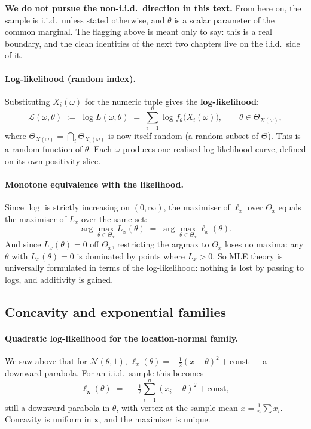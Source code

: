 \documentclass[a4paper,oneside,12pt]{extarticle}
\theoremstyle{plain}
\theoremstyle{definition}
\theoremstyle{remark}
\begin{document}
\textbf{We do not pursue the non-i.i.d.\ direction in this text.}
From here on, the sample is i.i.d.\ unless stated otherwise, and
$\theta$ is a scalar parameter of the common marginal.  The
flagging above is meant only to say: this is a real boundary, and
the clean identities of the next two chapters live on the
i.i.d.\ side of it.

\paragraph{Log-likelihood (random index).}
Substituting $X_i(\omega)$ for the numeric tuple gives the
\textbf{log-likelihood}:
\[
  \mathcal{L}(\omega,\theta)
  \;:=\; \log L(\omega,\theta)
  \;=\; \sum_{i=1}^n \log f_\theta\bigl(X_i(\omega)\bigr),
  \qquad
  \theta \in \Theta_{X(\omega)},
\]
where $\Theta_{X(\omega)} = \bigcap_i \Theta_{X_i(\omega)}$ is now
itself random (a random subset of $\Theta$).  This is a random
function of $\theta$.  Each $\omega$ produces one realised
log-likelihood curve, defined on its own positivity slice.

\paragraph{Monotone equivalence with the likelihood.}
Since $\log$ is strictly increasing on $(0,\infty)$, the maximiser of
$\ell_x$ over $\Theta_x$ equals the maximiser of $L_x$ over the same
set:
\[
  \arg\max_{\theta\in\Theta_x} L_x(\theta)
  \;=\;
  \arg\max_{\theta\in\Theta_x} \ell_x(\theta).
\]
And since $L_x(\theta) = 0$ off $\Theta_x$, restricting the
argmax to $\Theta_x$ loses no maxima: any $\theta$ with
$L_x(\theta) = 0$ is dominated by points where $L_x > 0$.  So MLE
theory is universally formulated in terms of the log-likelihood:
nothing is lost by passing to logs, and additivity is gained.

\subsection{Concavity and exponential families}

\paragraph{Quadratic log-likelihood for the location-normal family.}
We saw above that for $\mathcal{N}(\theta,1)$,
$\ell_x(\theta) = -\tfrac12(x-\theta)^2 + \text{const}$ ---
a downward parabola.  For an i.i.d.\ sample this becomes
\[
  \ell_{\mathbf{x}}(\theta)
  \;=\; -\tfrac{1}{2}\sum_{i=1}^n (x_i-\theta)^2 + \text{const},
\]
still a downward parabola in $\theta$, with vertex at the sample mean
$\bar x = \frac{1}{n}\sum x_i$.  Concavity is uniform in $\mathbf{x}$,
and the maximiser is unique.
\end{document}
